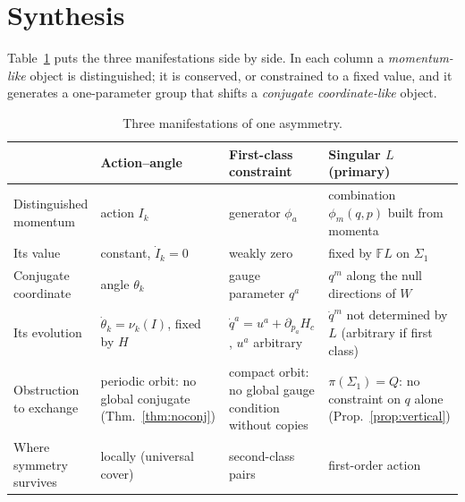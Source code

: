 \documentclass[11pt,a4paper]{article}
\theoremstyle{definition}
\theoremstyle{remark}
\newcommand{\FL}{\mathbb{F}\!L}
\begin{document}
\section{Synthesis}

Table~\ref{tab:three} puts the three manifestations side by side. In each column a \emph{momentum-like} object is distinguished; it is conserved, or constrained to a fixed value, and it generates a one-parameter group that shifts a \emph{conjugate coordinate-like} object.

\begin{table}[ht]
\centering
\small
\setlength{\tabcolsep}{4pt}
\renewcommand{\arraystretch}{1.25}
\begin{tabular}{@{}>{\raggedright\arraybackslash}p{2.5cm}>{\raggedright\arraybackslash}p{4.1cm}>{\raggedright\arraybackslash}p{4.1cm}>{\raggedright\arraybackslash}p{4.1cm}@{}}
\toprule
 & \textbf{Action--angle} & \textbf{First-class constraint} & \textbf{Singular $L$ (primary)}\\
\midrule
Distinguished momentum & action $I_k$ & generator $\phi_a$ & combination $\phi_m(q,p)$ built from momenta\\
Its value & constant, $\dot I_k=0$ & weakly zero & fixed by $\FL$ on $\Sigma_1$\\
Conjugate coordinate & angle $\theta_k$ & gauge parameter $q^a$ & $q^m$ along the null directions of $W$\\
Its evolution & $\dot\theta_k=\nu_k(I)$, fixed by $H$ & $\dot q^a=u^a+\partial_{p_a}H_c$, $u^a$ arbitrary & $\dot q^m$ not determined by $L$ (arbitrary if first class)\\
Obstruction to exchange & periodic orbit: no global conjugate (Thm.~\ref{thm:noconj}) & compact orbit: no global gauge condition without copies & $\pi(\Sigma_1)=Q$: no constraint on $q$ alone (Prop.~\ref{prop:vertical})\\
Where symmetry survives & locally (universal cover) & second-class pairs & first-order action\\
\bottomrule
\end{tabular}
\caption{Three manifestations of one asymmetry.}\label{tab:three}
\end{table}
\end{document}
